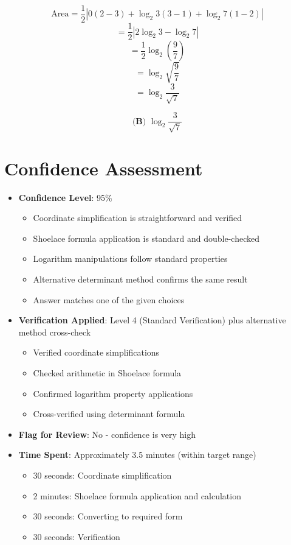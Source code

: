 \documentclass[12pt]{article}
\begin{document}
$$\text{Area} = \frac{1}{2}|0(2-3) + \log_2 3(3-1) + \log_2 7(1-2)|$$
$$= \frac{1}{2}|2\log_2 3 - \log_2 7|$$
$$= \frac{1}{2}\log_2\left(\frac{9}{7}\right)$$
$$= \log_2\sqrt{\frac{9}{7}}$$
$$= \log_2\frac{3}{\sqrt{7}}$$

$$\boxed{\textbf{(B) } \log_2\frac{3}{\sqrt{7}}}$$

\section*{Confidence Assessment}
\begin{itemize}[leftmargin=*]
    \item \textbf{Confidence Level}: 95\%
    \begin{itemize}
        \item Coordinate simplification is straightforward and verified
        \item Shoelace formula application is standard and double-checked
        \item Logarithm manipulations follow standard properties
        \item Alternative determinant method confirms the same result
        \item Answer matches one of the given choices
    \end{itemize}
    
    \item \textbf{Verification Applied}: Level 4 (Standard Verification) plus alternative method cross-check
    \begin{itemize}
        \item Verified coordinate simplifications
        \item Checked arithmetic in Shoelace formula
        \item Confirmed logarithm property applications
        \item Cross-verified using determinant formula
    \end{itemize}
    
    \item \textbf{Flag for Review}: No - confidence is very high
    
    \item \textbf{Time Spent}: Approximately 3.5 minutes (within target range)
    \begin{itemize}
        \item 30 seconds: Coordinate simplification
        \item 2 minutes: Shoelace formula application and calculation
        \item 30 seconds: Converting to required form
        \item 30 seconds: Verification
    \end{itemize}
\end{itemize}
\end{document}
